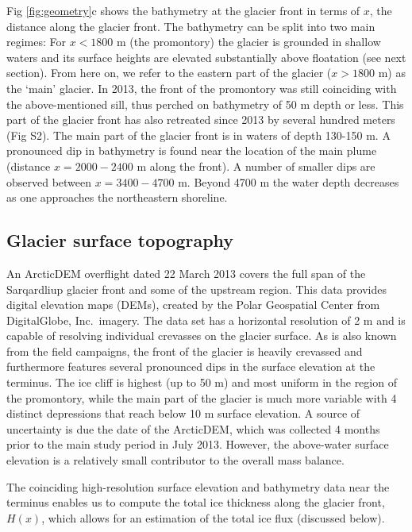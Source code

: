\documentclass[10pt,letterpaper]{article}
\begin{document}
Fig \ref{fig:geometry}c shows the bathymetry at the glacier front in terms of $x$, the distance along the glacier front. The bathymetry can be split into two main regimes: For $x < 1800$ m (the promontory) the glacier is grounded in shallow waters and its surface heights are elevated substantially above floatation (see next section). From here on, we refer to the eastern part of the glacier ($x > 1800$ m) as the `main' glacier. In 2013, the front of the promontory was still coinciding with the above-mentioned sill, thus perched on bathymetry of  50 m depth or less. This part of the glacier front has also retreated since 2013 by several hundred meters (Fig S2). The main part of the glacier front is in waters of depth 130-150 m. A pronounced dip in bathymetry is found near the location of the main plume (distance $x = 2000 - 2400$ m along the front). A number of smaller dips are observed between $x = 3400 - 4700$ m. Beyond 4700 m the water depth decreases as one approaches the northeastern shoreline.

\subsection{Glacier surface topography} \label{surface}

An ArcticDEM overflight dated 22 March 2013 covers the full span of the Sarqardliup glacier front and some of the upstream region. This data provides digital elevation maps (DEMs), created by the Polar Geospatial Center from DigitalGlobe, Inc.~imagery. The data set has a horizontal resolution of 2 m and is capable of resolving individual crevasses on the glacier surface. As is also known from the field campaigns, the front of the glacier is heavily crevassed and furthermore features several pronounced dips in the surface elevation at the terminus. The ice cliff is highest (up to 50 m) and most uniform in the region of the promontory, while the main part of the glacier is much more variable with 4 distinct depressions that reach below 10 m surface elevation. A source of uncertainty is due the date of the ArcticDEM, which was collected 4 months prior to the main study period in July 2013. However, the above-water surface elevation is a relatively small contributor to the overall mass balance.

The coinciding high-resolution surface elevation and bathymetry data near the terminus enables us to compute the total ice thickness along the glacier front, $H(x)$, which allows for an estimation of the total ice flux (discussed below). 
\end{document}

